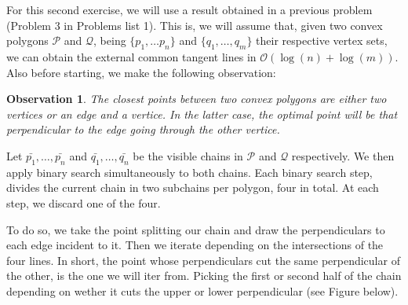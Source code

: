 \documentclass[a4paper, 10pt]{article}
\newtheorem{obs}{Observation}
\begin{document}
\vspace{3pt}

For this second exercise, we will use a result obtained in a previous problem (Problem 3 in Problems list 1). This is, we will assume that, given two convex polygons $\mathcal{P}$ and $\mathcal{Q}$, being $\lbrace p_1, \dots p_n \rbrace$ and $\lbrace q_1, \dots, q_m \rbrace$ their respective vertex sets, we can obtain the external common tangent lines in $\mathcal{O}(\log(n) + \log(m))$. Also before starting, we make the following observation:

\begin{obs}
    The closest points between two convex polygons are either two vertices or an edge and a vertice. In the latter case, the optimal point will be that perpendicular to the edge going through the other vertice.
\end{obs}

Let $\bar{p_1}, \dots, \bar{p_n}$ and $\bar{q_1}, \dots, \bar{q_n}$ be the visible chains in $\mathcal{P}$ and $\mathcal{Q}$ respectively. We then apply binary search simultaneously to both chains. Each binary search step, divides the current chain in two subchains per polygon, four in total. At each step, we discard one of the four.

To do so, we take the point splitting our chain and draw the perpendiculars to each edge incident to it. Then we iterate depending on the intersections of the four lines. In short, the point whose perpendiculars cut the same perpendicular of the other, is the one we will iter from. Picking the first or second half of the chain depending on wether it cuts the upper or lower perpendicular (see Figure below).
\end{document}
